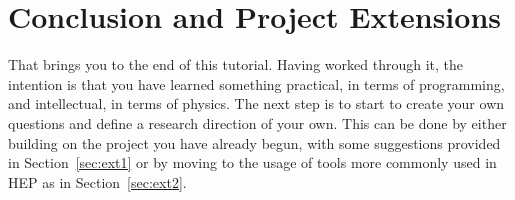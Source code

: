\documentclass[UKenglish,texlive=2016]{\ATLASLATEXPATH atlasdoc}
\begin{document}
\begin{center}
\end{center}


\section{Conclusion and Project Extensions}
\label{sec:extensions}
That brings you to the end of this tutorial.  Having worked through it, the intention is that you have learned something practical, in terms of programming, and intellectual, in terms of physics.  The next step is to start to create your own questions and define a research direction of your own.  This can be done by either building on the project you have already begun, with some suggestions provided in Section~\ref{sec:ext1} or by moving to the usage of tools more commonly used in HEP as in Section~\ref{sec:ext2}.
\end{document}
